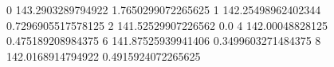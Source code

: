 0 143.2903289794922 1.7650299072265625
1 142.25498962402344 0.7296905517578125
2 141.52529907226562 0.0
4 142.00048828125 0.475189208984375
6 141.87525939941406 0.3499603271484375
8 142.0168914794922 0.4915924072265625
